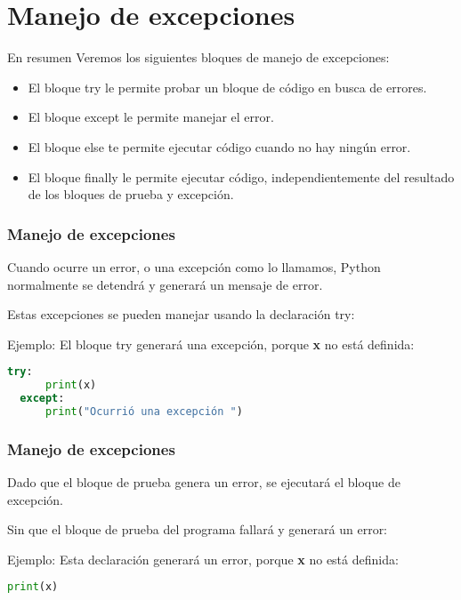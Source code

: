 
\section{Manejo de excepciones}

\begin{frame}[c]{En resumen}
  Veremos los siguientes bloques de manejo de excepciones:

  \vspace{\baselineskip}
  \begin{itemize}
    \item El bloque \textcolor{codeKeyword2}{try} le permite probar un
      bloque de código en busca de errores.
    \pausa
    \item El bloque \textcolor{codeKeyword2}{except} le permite manejar el
      error.
    \pausa
    \item El bloque \textcolor{codeKeyword2}{else} te permite ejecutar
      código cuando no hay ningún error.
    \pausa
    \item El bloque \textcolor{codeKeyword2}{finally} le permite ejecutar
      código, independientemente del resultado de los bloques de prueba y
      excepción.
  \end{itemize}
\end{frame}

\begin{frame}[fragile]
  \frametitle{Manejo de excepciones}
  Cuando ocurre un error, o una excepción como lo llamamos, Python
  normalmente se detendrá y generará un mensaje de error.

  \vspace{\baselineskip}
  Estas excepciones se pueden manejar usando la declaración
  \textcolor{codeKeyword2}{try}:

  \vspace{\baselineskip}
  Ejemplo: El bloque \textcolor{codeKeyword2}{try} generará una excepción,
  porque \textbf{x} no está definida:
  \begin{lstlisting}[language=Python]
  try:
      print(x)
  except:
      print("Ocurrió una excepción ")
  \end{lstlisting}
\end{frame}

\begin{frame}[fragile]
  \frametitle{Manejo de excepciones}
  Dado que el bloque de prueba genera un error, se ejecutará el
  bloque de excepción.

  \vspace{\baselineskip}
  Sin que el bloque de prueba del programa fallará y generará un error:

  \vspace{\baselineskip}
  Ejemplo: Esta declaración generará un error,
  porque \textbf{x} no está definida:
  \begin{lstlisting}[language=Python]
  print(x)
  \end{lstlisting}
\end{frame}

